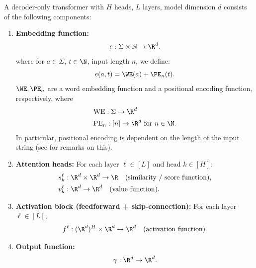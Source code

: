 \begin{definition}
    A decoder-only transformer with $H$ heads, $L$ layers, model dimension $d$ consists of the following components:
    
    \begin{enumerate}
        \item \textbf{Embedding function:}
        \[
        e : \Sigma \times \mathbb{N} \to \R^d.
        \]
        where for $a \in \Sigma$, $t \in \N$, input length $n$, we define:  
        \begin{equation}
            e(a, t) = \WE(a) + \PE_n(t).
        \end{equation}
        $\WE, \PE_n$ are a word embedding function and a positional encoding function, respectively, where
        \begin{align*}
            &\text{WE} : \Sigma \to \R^d \\ 
            &\text{PE}_n : [n] \to \R^d \text{ for $n \in \N$}.
        \end{align*}
        In particular, positional encoding is dependent on the length of the input string (see \cite{Strobl_2024} for remarks on this). 
        
        \item \textbf{Attention heads:} 
        For each layer $\ell \in [L]$ and head $k \in [H]$:
        \begin{align*}
            s_k^\ell &: \R^d \times \R^d \to \R 
            \quad \text{(similarity / score function)}, \\
            v_k^\ell &: \R^d \to \R^d
            \quad \text{(value function)}.
        \end{align*}
    
        \item \textbf{Activation block (feedforward + skip-connection):}
        For each layer $\ell \in [L]$,
        \[
        f^\ell : (\R^d)^{H} \times \R^d \to \R^d \quad\text{(activation function)}.
        \]
    
        \item \textbf{Output function:}
        \[
        \gamma : \R^d \to \R^d.
        \]
    \end{enumerate}

\end{definition}
